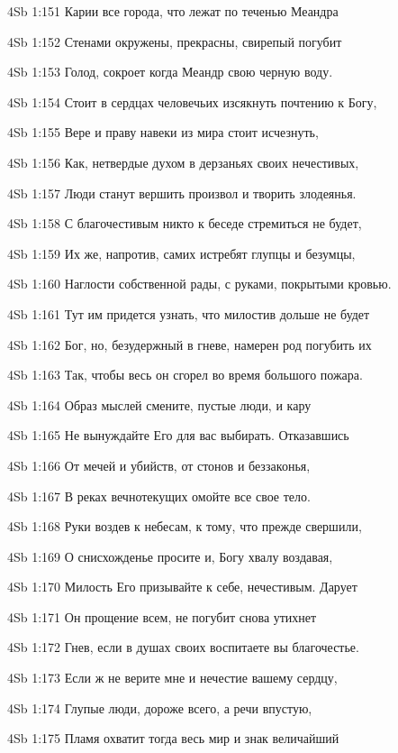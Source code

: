 \vs 4Sb 1:151 Карии все города, что лежат по теченью Меандра  

\vs 4Sb 1:152 Стенами окружены, прекрасны,  свирепый погубит 

\vs 4Sb 1:153 Голод, сокроет когда Меандр свою черную воду.

\vs 4Sb 1:154 Стоит в сердцах человечьих изсякнуть почтению к Богу,

\vs 4Sb 1:155 Вере и праву навеки из мира стоит исчезнуть,

\vs 4Sb 1:156 Как, нетвердые духом в дерзаньях своих нечестивых,

\vs 4Sb 1:157 Люди станут вершить произвол и творить злодеянья. 

\vs 4Sb 1:158 С благочестивым никто к беседе стремиться не будет, 

\vs 4Sb 1:159 Их же, напротив, самих истребят глупцы и безумцы, 

\vs 4Sb 1:160 Наглости собственной рады, с руками, покрытыми кровью. 

\vs 4Sb 1:161 Тут им придется узнать, что милостив дольше не будет

\vs 4Sb 1:162 Бог, но, безудержный в гневе, намерен род погубить их  

\vs 4Sb 1:163 Так, чтобы весь он сгорел во время большого пожара.

\vs 4Sb 1:164 Образ мыслей смените, пустые люди, и кару

\vs 4Sb 1:165 Не вынуждайте Его для вас выбирать. Отказавшись

\vs 4Sb 1:166 От мечей и убийств, от стонов и беззаконья, 

\vs 4Sb 1:167 В реках вечнотекущих омойте все свое тело.

\vs 4Sb 1:168 Руки воздев к небесам, к тому, что прежде свершили, 

\vs 4Sb 1:169 О снисхожденье просите и, Богу хвалу воздавая, 

\vs 4Sb 1:170 Милость Его призывайте к себе, нечестивым. Дарует 

\vs 4Sb 1:171 Он прощение всем, не погубит  снова утихнет 

\vs 4Sb 1:172 Гнев, если в душах своих воспитаете вы благочестье. 

\vs 4Sb 1:173 Если ж не верите мне и нечестие вашему сердцу, 

\vs 4Sb 1:174 Глупые люди, дороже всего, а речи  впустую, 

\vs 4Sb 1:175 Пламя охватит тогда весь мир и знак величайший 

